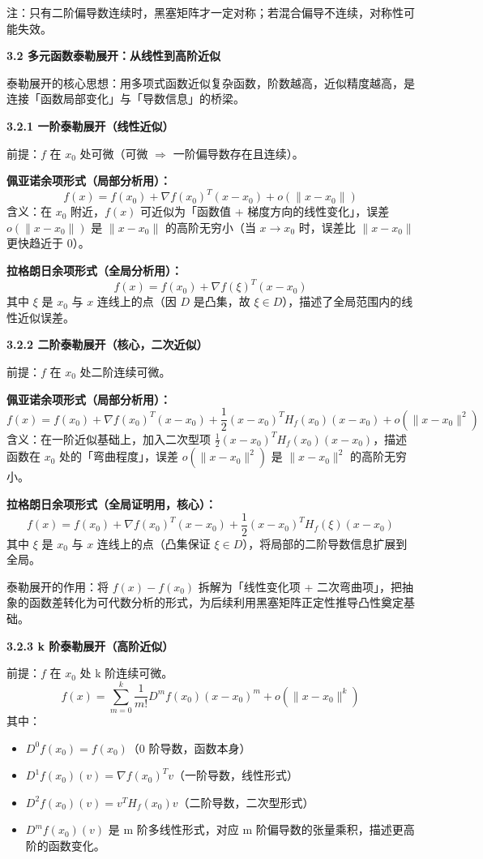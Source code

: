 \documentclass[10pt]{article}
\numberwithin{equation}{section}
\theoremstyle{plain}
\theoremstyle{definition}
\theoremstyle{remark}
\newcommand{\norm}[1]{\lVert #1 \rVert}
\begin{document}
\begin{RemarkBox}
	注：只有二阶偏导数连续时，黑塞矩阵才一定对称；若混合偏导不连续，对称性可能失效。
\end{RemarkBox}

\textbf{3.2 多元函数泰勒展开：从线性到高阶近似}

泰勒展开的核心思想：用多项式函数近似复杂函数，阶数越高，近似精度越高，是连接「函数局部变化」与「导数信息」的桥梁。

\textbf{3.2.1 一阶泰勒展开（线性近似）}

前提：$f$ 在 $x_0$ 处可微（可微 $\Rightarrow$ 一阶偏导数存在且连续）。

\textbf{佩亚诺余项形式（局部分析用）：}
\[f(x)=f(x_0)+\nabla f(x_0)^T(x-x_0)+o(\norm{x-x_0})\]
含义：在 $x_0$ 附近，$f(x)$ 可近似为「函数值 + 梯度方向的线性变化」，误差 $o(\norm{x-x_0})$ 是 $\norm{x-x_0}$ 的高阶无穷小（当 $x\to x_0$ 时，误差比 $\norm{x-x_0}$ 更快趋近于 0）。

\textbf{拉格朗日余项形式（全局分析用）：}
\[f(x)=f(x_0)+\nabla f(\xi)^T(x-x_0)\]
其中 $\xi$ 是 $x_0$ 与 $x$ 连线上的点（因 $D$ 是凸集，故 $\xi\in D$），描述了全局范围内的线性近似误差。

\textbf{3.2.2 二阶泰勒展开（核心，二次近似）}

前提：$f$ 在 $x_0$ 处二阶连续可微。

\textbf{佩亚诺余项形式（局部分析用）：}
\[f(x)=f(x_0)+\nabla f(x_0)^T(x-x_0)+\frac{1}{2}(x-x_0)^TH_f(x_0)(x-x_0)+o(\norm{x-x_0}^2)\]
含义：在一阶近似基础上，加入二次型项 $\frac{1}{2}(x-x_0)^TH_f(x_0)(x-x_0)$，描述函数在 $x_0$ 处的「弯曲程度」，误差 $o(\norm{x-x_0}^2)$ 是 $\norm{x-x_0}^2$ 的高阶无穷小。

\textbf{拉格朗日余项形式（全局证明用，核心）：}
\[f(x)=f(x_0)+\nabla f(x_0)^T(x-x_0)+\frac{1}{2}(x-x_0)^TH_f(\xi)(x-x_0)\]
其中 $\xi$ 是 $x_0$ 与 $x$ 连线上的点（凸集保证 $\xi\in D$），将局部的二阶导数信息扩展到全局。

泰勒展开的作用：将 $f(x)-f(x_0)$ 拆解为「线性变化项 + 二次弯曲项」，把抽象的函数差转化为可代数分析的形式，为后续利用黑塞矩阵正定性推导凸性奠定基础。

\textbf{3.2.3 k 阶泰勒展开（高阶近似）}

前提：$f$ 在 $x_0$ 处 k 阶连续可微。
\[f(x)=\sum_{m=0}^{k}\frac{1}{m!}D^mf(x_0)(x-x_0)^m+o(\norm{x-x_0}^k)\]
其中：
\begin{itemize}
	\item $D^0f(x_0)=f(x_0)$（0 阶导数，函数本身）
	\item $D^1f(x_0)(v)=\nabla f(x_0)^Tv$（一阶导数，线性形式）
	\item $D^2f(x_0)(v)=v^TH_f(x_0)v$（二阶导数，二次型形式）
	\item $D^mf(x_0)(v)$ 是 m 阶多线性形式，对应 m 阶偏导数的张量乘积，描述更高阶的函数变化。
\end{itemize}
\end{document}
